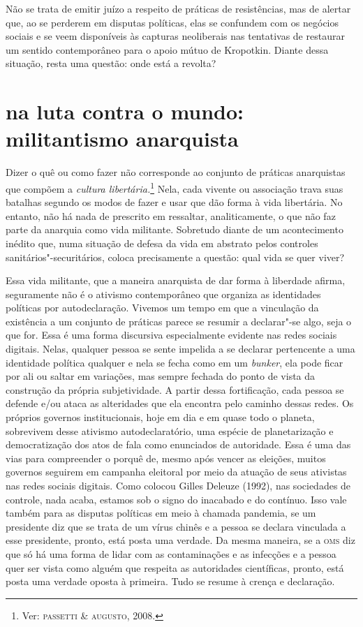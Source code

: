 Não se trata de emitir juízo a respeito de práticas de resistências, mas
de alertar que, ao se perderem em disputas políticas, elas se confundem
com os negócios sociais e se veem disponíveis às capturas neoliberais
nas tentativas de restaurar um sentido contemporâneo para o apoio mútuo
de Kropotkin. Diante dessa situação, resta uma questão: onde está a
revolta?

\section{na luta contra o mundo: militantismo anarquista}

Dizer o quê ou como fazer não corresponde ao conjunto de práticas
anarquistas que compõem a \emph{cultura libertária.}\footnote{Ver:
  \textsc{passetti} \& \textsc{augusto}, 2008.} Nela, cada vivente ou associação trava
suas batalhas segundo os modos de fazer e usar que dão forma à vida
libertária. No entanto, não há nada de prescrito em ressaltar,
analiticamente, o que não faz parte da anarquia como vida militante.
Sobretudo diante de um acontecimento inédito que, numa situação de
defesa da vida em abstrato pelos controles sanitários"-securitários,
coloca precisamente a questão: qual vida se quer viver?

Essa vida militante, que a maneira anarquista de dar forma à liberdade
afirma, seguramente não é o ativismo contemporâneo que organiza as
identidades políticas por autodeclaração. Vivemos um tempo em que a
vinculação da existência a um conjunto de práticas parece se resumir a
declarar"-se algo, seja o que for. Essa é uma forma discursiva
especialmente evidente nas redes sociais digitais. Nelas, qualquer
pessoa se sente impelida a se declarar pertencente a uma identidade
política qualquer e nela se fecha como em um \emph{bunker}, ela pode
ficar por ali ou saltar em variações, mas sempre fechada do ponto de
vista da construção da própria subjetividade. A partir dessa
fortificação, cada pessoa se defende e/ou ataca as alteridades que ela
encontra pelo caminho dessas redes. Os próprios governos institucionais,
hoje em dia e em quase todo o planeta, sobrevivem desse ativismo
autodeclaratório, uma espécie de planetarização e democratização dos
atos de fala como enunciados de autoridade. Essa é uma das vias para
compreender o porquê de, mesmo após vencer as eleições, muitos governos
seguirem em campanha eleitoral por meio da atuação de seus ativistas nas
redes sociais digitais. Como colocou Gilles Deleuze (1992), nas
sociedades de controle, nada acaba, estamos sob o signo do inacabado e
do contínuo. Isso vale também para as disputas políticas em meio à
chamada pandemia, se um presidente diz que se trata de um vírus chinês e
a pessoa se declara vinculada a esse presidente, pronto, está posta uma
verdade. Da mesma maneira, se a \textsc{oms} diz que só há uma forma de lidar com
as contaminações e as infecções e a pessoa quer ser vista como alguém
que respeita as autoridades científicas, pronto, está posta uma verdade
oposta à primeira. Tudo se resume à crença e declaração.

